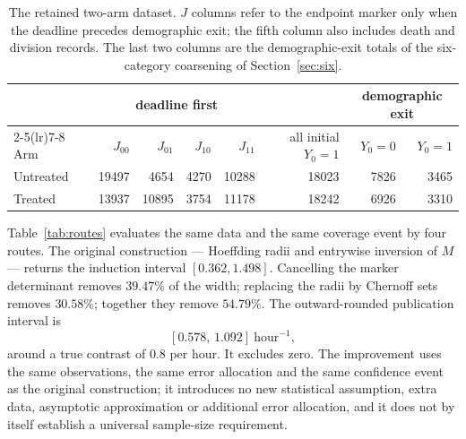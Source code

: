 \documentclass[11pt]{article}
\theoremstyle{definition}
\begin{document}
\begin{table}[tb]
\caption{The retained two-arm dataset. $J$ columns refer to the endpoint marker
only when the deadline precedes demographic exit; the fifth column also includes
death and division records. The last two columns are the demographic-exit totals
of the six-category coarsening of Section~\ref{sec:six}.}
\label{tab:counts}\centering\small
\begin{tabular}{lrrrrrrr}
\toprule
& \multicolumn{4}{c}{deadline first} & & \multicolumn{2}{c}{demographic exit}\\
\cmidrule(lr){2-5}\cmidrule(lr){7-8}
Arm & $J_{00}$ & $J_{01}$ & $J_{10}$ & $J_{11}$ & all initial $Y_0=1$
    & $Y_0=0$ & $Y_0=1$\\
\midrule
Untreated & 19497 & 4654 & 4270 & 10288 & 18023 & 7826 & 3465\\
Treated   & 13937 & 10895 & 3754 & 11178 & 18242 & 6926 & 3310\\
\bottomrule
\end{tabular}
\end{table}

Table~\ref{tab:routes} evaluates the same data and the same coverage event by
four routes. The original construction --- Hoeffding radii and entrywise
inversion of $M$ --- returns the induction interval $[0.362,1.498]$. Cancelling
the marker determinant removes $39.47\%$ of the width; replacing the radii by
Chernoff sets removes $30.58\%$; together they remove $54.79\%$. The
outward-rounded publication interval is
\begin{equation}\label{eq:workedCI}
                 [0.578,\,1.092]\ \mathrm{hour}^{-1},
\end{equation}
around a true contrast of $0.8$ per hour. It excludes zero. The improvement uses
the same observations, the same error allocation and the same confidence event
as the original construction; it introduces no new statistical assumption, extra
data, asymptotic approximation or additional error allocation, and it does not
by itself establish a universal sample-size requirement.
\end{document}
